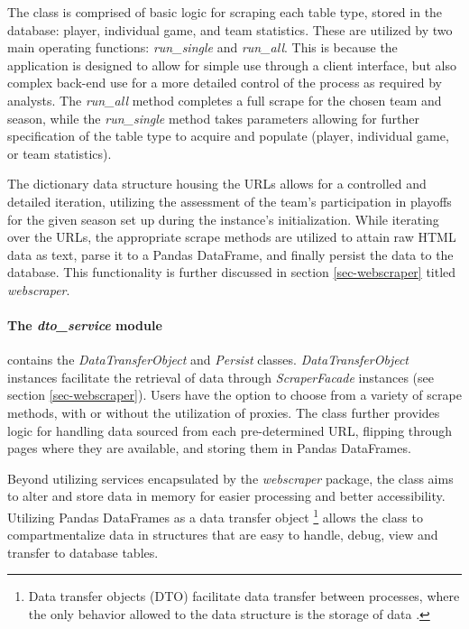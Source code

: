 \documentclass{thesis-ekf}
\theoremstyle{definition}
\theoremstyle{remark}
\begin{document}
The class is comprised of basic logic for scraping each table type, stored in the database: player, individual game, and team statistics. These are utilized by two main operating functions: \emph{run\_single} and \emph{run\_all}. This is because the application is designed to allow for simple use through a client interface, but also complex back-end use for a more detailed control of the process as required by analysts. The \emph{run\_all} method completes a full scrape for the chosen team and season, while the \emph{run\_single} method takes parameters allowing for further specification of the table type to acquire and populate (player, individual game, or team statistics).

The dictionary data structure housing the URLs allows for a controlled and detailed iteration, utilizing the assessment of the team's participation in playoffs for the given season set up during the instance's initialization. While iterating over the URLs, the appropriate scrape methods are utilized to attain raw HTML data as text, parse it to a Pandas DataFrame, and finally persist the data to the database. This functionality is further discussed in section \ref{sec-webscraper} titled \emph{webscraper}.

\paragraph{The \emph{dto\_service} module} contains the \emph{DataTransferObject}\label{element-dto} and \emph{Persist} classes. \emph{DataTransferObject} instances facilitate the retrieval of data through \emph{ScraperFacade} instances (see section \ref{sec-webscraper}). Users have the option to choose from a variety of scrape methods, with or without the utilization of proxies. The class further provides logic for handling data sourced from each pre-determined URL, flipping through pages where they are available, and storing them in Pandas DataFrames. 

Beyond utilizing services encapsulated by the \emph{webscraper} package, the class aims to alter and store data in memory for easier processing and better accessibility. Utilizing Pandas DataFrames as a data transfer object \footnote{Data transfer objects (DTO) facilitate data transfer between processes, where the only behavior allowed to the data structure is the storage of data \cite{dto-wiki}.} allows the class to compartmentalize data in structures that are easy to handle, debug, view and transfer to database tables.
\end{document}

